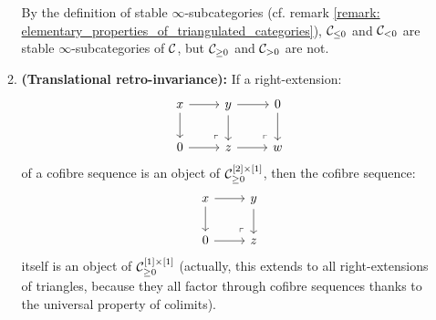 \begin{definition}[t-structures]
\begin{enumerate}
\begin{enumerate}
                                By the definition of stable $\infty$-subcategories (cf. remark \ref{remark: elementary_properties_of_triangulated_categories}), $\mathcal{C}_{\leq 0}$ and $\mathcal{C}_{< 0}$ are stable $\infty$-subcategories of $\mathcal{C}$, but $\mathcal{C}_{\geq 0}$ and $\mathcal{C}_{> 0}$ are not. 
                                \item \textbf{(Translational retro-invariance):} If a right-extension:
                                    $$
                                        \begin{tikzcd}
                                        	x & y & 0 \\
                                        	0 & z & w
                                        	\arrow[from=2-1, to=2-2]
                                        	\arrow[from=1-2, to=2-2]
                                        	\arrow[from=1-1, to=1-2]
                                        	\arrow[from=1-1, to=2-1]
                                        	\arrow["\lrcorner"{anchor=center, pos=0.125, rotate=180}, draw=none, from=2-2, to=1-1]
                                        	\arrow[from=2-2, to=2-3]
                                        	\arrow[from=1-2, to=1-3]
                                        	\arrow[from=1-3, to=2-3]
                                        	\arrow["\lrcorner"{anchor=center, pos=0.125, rotate=180}, draw=none, from=2-3, to=1-2]
                                        \end{tikzcd}
                                    $$
                                of a cofibre sequence is an object of $\C_{\geq 0}^{[2] \x [1]}$, then the cofibre sequence:
                                    $$
                                        \begin{tikzcd}
                                        	x & y \\
                                        	0 & z
                                        	\arrow[from=2-1, to=2-2]
                                        	\arrow[from=1-2, to=2-2]
                                        	\arrow[from=1-1, to=1-2]
                                        	\arrow[from=1-1, to=2-1]
                                        	\arrow["\lrcorner"{anchor=center, pos=0.125, rotate=180}, draw=none, from=2-2, to=1-1]
                                        \end{tikzcd}
                                    $$
                                itself is an object of $\C_{\geq 0}^{[1] \x [1]}$ (actually, this extends to all right-extensions of triangles, because they all factor through cofibre sequences thanks to the universal property of colimits). 
                                

\end{enumerate}
\end{enumerate}
\end{definition}
